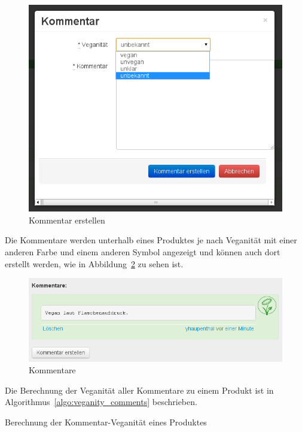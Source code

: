 \begin{figure}[ht]
  \centering
  \includegraphics[scale=0.5]{pics/create_comment.png}
  \caption{Kommentar erstellen}
  \label{img:create_comment}
\end{figure}

Die Kommentare werden unterhalb eines Produktes je nach Veganität mit einer 
anderen Farbe und einem anderen Symbol angezeigt und können auch dort erstellt 
werden, wie in Abbildung~\ref{img:comments} zu sehen ist.

\begin{figure}[ht]
  \centering
  \includegraphics[scale=0.5]{pics/comments.png}
  \caption{Kommentare}
  \label{img:comments}
\end{figure}

Die Berechnung der Veganität aller Kommentare zu einem Produkt ist in 
Algorithmus~\ref{algo:veganity_comments} beschrieben.

\begin{algorithm}[ht]
  \SetAlgoLined
  \BlankLine
  

  \caption{Berechnung der Kommentar-Veganität eines Produktes}
  \label{algo:veganity_comments}
\end{algorithm}

